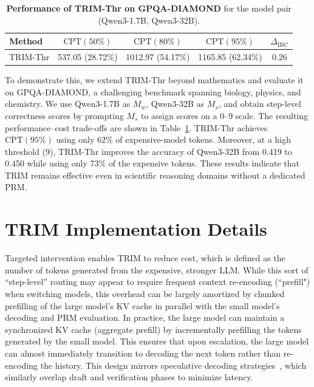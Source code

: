 \documentclass{article}
\theoremstyle{plain}
\theoremstyle{definition}
\theoremstyle{remark}
\begin{document}
\begin{table}[t]
\caption{\footnotesize \textbf{Performance of TRIM-Thr on GPQA-DIAMOND} for the model pair (Qwen3-1.7B, Qwen3-32B).}
\label{tab:GPQA}
\centering
\begin{tabular}{lcccc}
\toprule
Method & $\mathrm{CPT}(50\%)$ & $\mathrm{CPT}(80\%)$ & $\mathrm{CPT}(95\%)$ & $\Delta_{\text{IBC}}$\\
\midrule
TRIM-Thr &  537.05 (28.72\%)  & 1012.97 (54.17\%) & 1165.85 (62.34\%)  & 0.26\\
\bottomrule
\end{tabular}
\end{table}

To demonstrate this, we extend TRIM-Thr beyond mathematics and evaluate it on GPQA-DIAMOND, a challenging benchmark spanning biology, physics, and chemistry. We use Qwen3-1.7B as $M_w$, Qwen3-32B as $M_s$, and obtain step-level correctness scores by prompting $M_s$ to assign scores on a 0–9 scale. The resulting performance–cost trade-offs are shown in Table~\ref{tab:GPQA}. TRIM-Thr achieves $\mathrm{CPT}(95\%)$ using only 62\% of expensive-model tokens. Moreover, at a high threshold (9), TRIM-Thr improves the accuracy of Qwen3-32B from 0.419 to 0.450 while using only 73\% of the expensive tokens. These results indicate that TRIM remains effective even in scientific reasoning domains without a dedicated PRM.
\section{TRIM Implementation Details}
\label{appendix: setup}
Targeted intervention enables TRIM to reduce cost, which is defined as the number of tokens generated from the expensive, stronger LLM. While this sort of ``step-level'' routing may appear to require frequent context re-encoding (``prefill") when switching models, this overhead can be largely amortized by chunked prefilling of the large model's KV cache in parallel with the small model’s decoding and PRM evaluation. In practice, the large model can maintain a synchronized KV cache (aggregate prefill) by incrementally prefilling the tokens generated by the small model. This ensures that upon escalation, the large model can almost immediately transition to decoding the next token rather than re-encoding the history. This design mirrors speculative decoding strategies~\citep{speculative, medusa}, which similarly overlap draft and verification phases to minimize latency.
\end{document}
